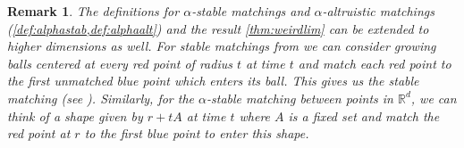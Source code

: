 \documentclass{article}
\newtheorem{remark}{Remark}
\newcommand{\R}{\mathbb{R}}
\begin{document}
\begin{remark}\label{rem:alphastab}
The definitions for $\alpha$-stable matchings and $\alpha$-altruistic
  matchings (\cref{def:alphastab,def:alphaalt}) and the result
  \cref{thm:weirdlim} can be extended to higher dimensions as well.
For stable matchings from \cite{minimal} we can consider growing balls centered at every red
  point of radius $t$ at time $t$ and match each red point to the
  first unmatched blue point which enters its ball. This gives us the
  stable matching (see \cite[Lemma 8]{minimal}).
  Similarly, for the $\alpha$-stable matching between points in
  $\R^d$, we can think of a shape given by $r+t A$ at time $t$ where
  $A$ is a fixed set and match the red point at $r$ to the first blue
  point to enter this shape.


\end{remark}
\end{document}
